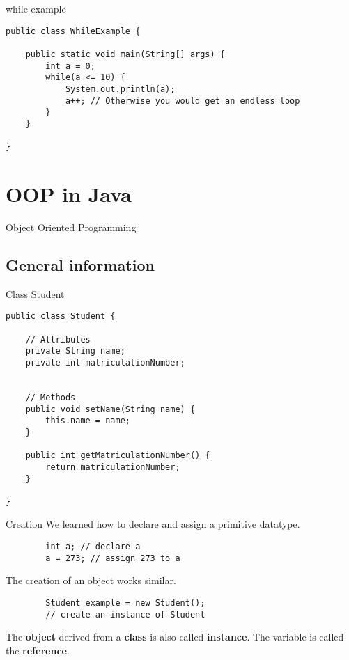 \begin{frame}[fragile]{while example}
\begin{lstlisting}
public class WhileExample {

	public static void main(String[] args) {
		int a = 0;
		while(a <= 10) {
			System.out.println(a);
            a++; // Otherwise you would get an endless loop
		}
	}
    
}
\end{lstlisting}
\end{frame}


\section{OOP in Java}

\begin{frame}{}
	\begin{center}
		{\huge Object Oriented Programming}
	\end{center}
\end{frame}

\subsection{General information}

\begin{frame}[fragile]{Class Student}
\begin{lstlisting}
public class Student {

	// Attributes
	private String name; 
	private int matriculationNumber; 
	
	
	// Methods
	public void setName(String name) {
		this.name = name;
	}
    
	public int getMatriculationNumber() {
		return matriculationNumber;
	}
    
}
\end{lstlisting}


\end{frame}

\begin{frame}[fragile]{Creation}
	We learned how to declare and assign a primitive datatype.
	
	\begin{lstlisting}
	    int a; // declare a
	    a = 273; // assign 273 to a
	\end{lstlisting} 
	
	The creation of an object works similar.
	
	\begin{lstlisting}
	    Student example = new Student(); 
		// create an instance of Student
	\end{lstlisting}
	The \textbf{object} derived from a \textbf{class} is also called \textbf{instance}.
	The variable is called the \textbf{reference}.
\end{frame}

